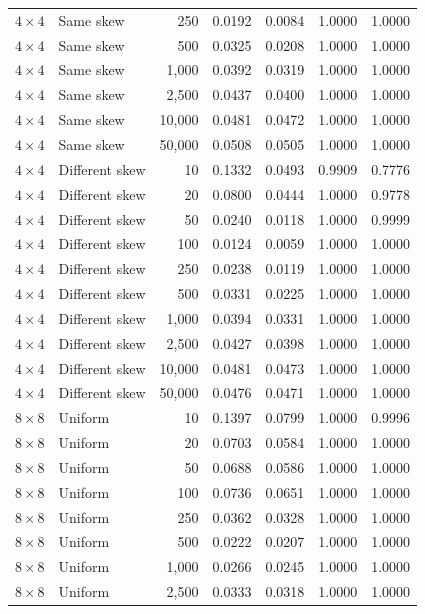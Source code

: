 \begin{longtable}{@{}llrrrrr@{}}
\(4\times4\) & Same skew & 250 & 0.0192 & 0.0084 & 1.0000 & 1.0000\\
\(4\times4\) & Same skew & 500 & 0.0325 & 0.0208 & 1.0000 & 1.0000\\
\(4\times4\) & Same skew & 1,000 & 0.0392 & 0.0319 & 1.0000 & 1.0000\\
\(4\times4\) & Same skew & 2,500 & 0.0437 & 0.0400 & 1.0000 & 1.0000\\
\(4\times4\) & Same skew & 10,000 & 0.0481 & 0.0472 & 1.0000 & 1.0000\\
\(4\times4\) & Same skew & 50,000 & 0.0508 & 0.0505 & 1.0000 & 1.0000\\
\(4\times4\) & Different skew & 10 & 0.1332 & 0.0493 & 0.9909 & 0.7776\\
\(4\times4\) & Different skew & 20 & 0.0800 & 0.0444 & 1.0000 & 0.9778\\
\(4\times4\) & Different skew & 50 & 0.0240 & 0.0118 & 1.0000 & 0.9999\\
\(4\times4\) & Different skew & 100 & 0.0124 & 0.0059 & 1.0000 & 1.0000\\
\(4\times4\) & Different skew & 250 & 0.0238 & 0.0119 & 1.0000 & 1.0000\\
\(4\times4\) & Different skew & 500 & 0.0331 & 0.0225 & 1.0000 & 1.0000\\
\(4\times4\) & Different skew & 1,000 & 0.0394 & 0.0331 & 1.0000 & 1.0000\\
\(4\times4\) & Different skew & 2,500 & 0.0427 & 0.0398 & 1.0000 & 1.0000\\
\(4\times4\) & Different skew & 10,000 & 0.0481 & 0.0473 & 1.0000 & 1.0000\\
\(4\times4\) & Different skew & 50,000 & 0.0476 & 0.0471 & 1.0000 & 1.0000\\
\midrule
\(8\times8\) & Uniform & 10 & 0.1397 & 0.0799 & 1.0000 & 0.9996\\
\(8\times8\) & Uniform & 20 & 0.0703 & 0.0584 & 1.0000 & 1.0000\\
\(8\times8\) & Uniform & 50 & 0.0688 & 0.0586 & 1.0000 & 1.0000\\
\(8\times8\) & Uniform & 100 & 0.0736 & 0.0651 & 1.0000 & 1.0000\\
\(8\times8\) & Uniform & 250 & 0.0362 & 0.0328 & 1.0000 & 1.0000\\
\(8\times8\) & Uniform & 500 & 0.0222 & 0.0207 & 1.0000 & 1.0000\\
\(8\times8\) & Uniform & 1,000 & 0.0266 & 0.0245 & 1.0000 & 1.0000\\
\(8\times8\) & Uniform & 2,500 & 0.0333 & 0.0318 & 1.0000 & 1.0000\\

\end{longtable}
